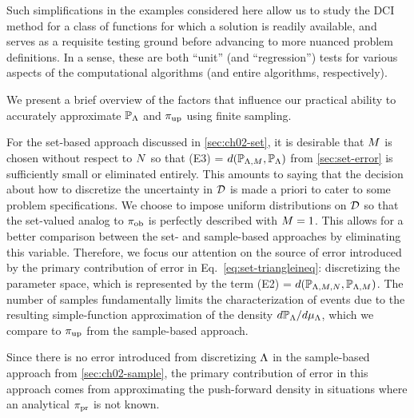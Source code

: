 Such simplifications in the examples considered here allow us to study the DCI method for a class of functions for which a solution is readily available, and serves as a requisite testing ground before advancing to more nuanced problem definitions.
In a sense, these are both ``unit'' (and ``regression'') tests for various aspects of the computational algorithms (and entire algorithms, respectively).

We present a brief overview of the factors that influence our practical ability to accurately approximate $\mathbb{P}_{\Lambda}$ and $\operatorname*{\pi_{up}}$ using finite sampling.

For the set-based approach discussed in \ref{sec:ch02-set}, it is desirable that $M$ is chosen without respect to $N$ so that (E3) = $d(\mathbb{P}_{{\Lambda}, M}, \mathbb{P}_{\Lambda})$ from \ref{sec:set-error} is sufficiently small or eliminated entirely.
This amounts to saying that the decision about how to discretize the uncertainty in $\mathcal{D}$ is made a priori to cater to some problem specifications.
We choose to impose uniform distributions on $\mathcal{D}$ so that the set-valued analog to $\operatorname*{\pi_{ob}}$ is perfectly described with $M=1$.
This allows for a better comparison between the set- and sample-based approaches by eliminating this variable.
Therefore, we focus our attention on the source of error introduced by the primary contribution of error in Eq.~\eqref{eq:set-triangleineq}:  discretizing the parameter space, which is represented by the term (E2) = $d(\mathbb{P}_{{\Lambda}, M, N}, \mathbb{P}_{{\Lambda}, M})$.
The number of samples fundamentally limits the characterization of events due to the resulting simple-function approximation of the density $d\mathbb{P}_{\Lambda} / d\mu_{{\Lambda}}$, which we compare to $\operatorname*{\pi_{up}}$ from the sample-based approach.

Since there is no error introduced from discretizing ${\Lambda}$ in the sample-based approach from \ref{sec:ch02-sample}, the primary contribution of error in this approach comes from approximating the push-forward density in situations where an analytical $\operatorname*{\pi_{pr}}$ is not known.

\FloatBarrier

\FloatBarrier

\FloatBarrier
